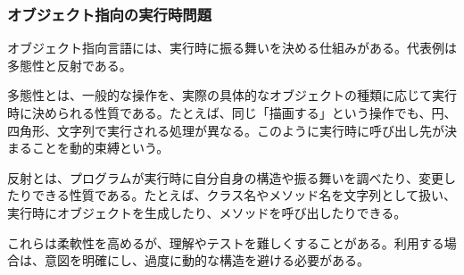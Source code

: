 \subsubsection{オブジェクト指向の実行時問題}

オブジェクト指向言語には、実行時に振る舞いを決める仕組みがある。代表例は多態性と反射である。

多態性とは、一般的な操作を、実際の具体的なオブジェクトの種類に応じて実行時に決められる性質である。たとえば、同じ「描画する」という操作でも、円、四角形、文字列で実行される処理が異なる。このように実行時に呼び出し先が決まることを動的束縛という。

反射とは、プログラムが実行時に自分自身の構造や振る舞いを調べたり、変更したりできる性質である。たとえば、クラス名やメソッド名を文字列として扱い、実行時にオブジェクトを生成したり、メソッドを呼び出したりできる。

これらは柔軟性を高めるが、理解やテストを難しくすることがある。利用する場合は、意図を明確にし、過度に動的な構造を避ける必要がある。
